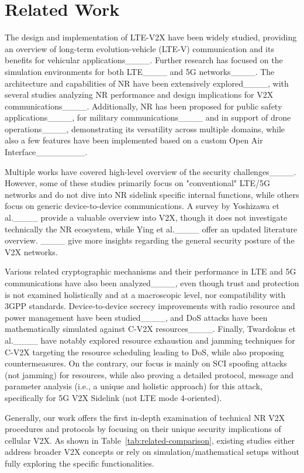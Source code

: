 \section{Related Work}
\label{sec:related-work}

The design and implementation of LTE-V2X have been widely studied, providing an overview of long-term evolution-vehicle (LTE-V) communication and its benefits for vehicular applications____. Further research has focused on the simulation environments for both LTE____ and 5G networks____. The architecture and capabilities of NR have been extensively explored____, with several studies analyzing NR performance and design implications for V2X communications____. Additionally, NR has been proposed for public safety applications____, for military communications____ and in support of drone operations____, demonstrating its versatility across multiple domains, while also a few features have been implemented based on a custom Open Air Interface________.

Multiple works have covered high-level overview of the security challenges____. However, some of these studies primarily focus on "conventional" LTE/5G networks and do not dive into NR sidelink specific internal functions, while others focus on generic device-to-device communications. A survey by Yoshizawa et al.____ provide a valuable overview into V2X, though it does not investigate technically the NR ecosystem, while Ying et al.____ offer an updated literature overview. ____ give more insights regarding the general security posture of the V2X networks.

Various related cryptographic mechanisms and their performance in LTE and 5G communications have also been analyzed____, even though trust and protection is not examined holistically and at a macroscopic level, nor compatibility with 3GPP standards. Device-to-device secrecy improvements with radio resource and power management have been studied____, and DoS attacks have been mathematically simulated against C-V2X resources____. Finally, Twardokus et al.____ have notably explored resource exhaustion and jamming techniques for C-V2X targeting the resource scheduling leading to DoS, while also proposing countermeasures. On the contrary, our focus is mainly on SCI spoofing attacks (not jamming) for resources, while also proving a detailed protocol, message and parameter analysis (i.e., a unique and holistic approach) for this attack, specifically for 5G V2X Sidelink (not LTE mode 4-oriented).

Generally, our work offers the first in-depth examination of technical NR V2X procedures and protocols by focusing on their unique security implications of cellular V2X. As shown in Table~\ref{tab:related-comparison}, existing studies either address broader V2X concepts or rely on simulation/mathematical setups without fully exploring the specific functionalities.